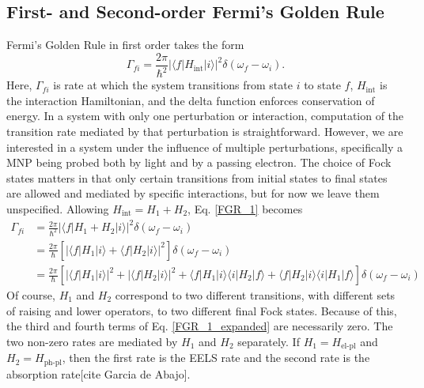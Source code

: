 \documentclass [11pt, proquest] {uwthesis}[2016/11/22]
\begin{document}
\subsection{First- and Second-order Fermi's Golden Rule}

Fermi's Golden Rule in first order takes the form
\begin{equation}
\Gamma_{fi} = \frac{2\pi}{\hbar^2}|\langle f |H_{\textrm{int}}| i \rangle |^2 \delta(\omega_f - \omega_i).
\label{FGR_1}
\end{equation}
Here, $\Gamma_{fi}$ is rate at which the system transitions from state $i$ to state $f$, $H_{\textrm{int}}$ is the interaction Hamiltonian, and the delta function enforces conservation of energy. In a system with only one perturbation or interaction, computation of the transition rate mediated by that perturbation is straightforward. However, we are interested in a system under the influence of multiple perturbations, specifically a MNP being probed both by light and by a passing electron. The choice of Fock states matters in that only certain transitions from initial states to final states are allowed and mediated by specific interactions, but for now we leave them unspecified. Allowing $H_{\textrm{int}} = H_1 + H_2$, Eq. \ref{FGR_1} becomes
\begin{equation}
\begin{aligned}
\Gamma_{fi} &= \frac{2\pi}{\hbar^2}|\langle f |H_1 + H_2| i \rangle |^2 \delta(\omega_f - \omega_i)\\
&= \frac{2\pi}{\hbar}\left[|\langle f |H_1| i \rangle + \langle f |H_2| i \rangle |^2\right] \delta(\omega_f - \omega_i)\\
& = \frac{2\pi}{\hbar}\left[|\langle f|H_1|i \rangle|^2 + |\langle f|H_2|i \rangle|^2 + \langle f|H_1|i \rangle \langle i|H_2|f \rangle + \langle f|H_2|i \rangle \langle i|H_1|f \rangle\right]\delta(\omega_f - \omega_i)
\label{FGR_1_expanded}
\end{aligned}
\end{equation}
Of course, $H_1$ and $H_2$ correspond to two different transitions, with different sets of raising and lower operators, to two different final Fock states. Because of this, the third and fourth terms of Eq. \ref{FGR_1_expanded} are necessarily zero. The two non-zero rates are mediated by $H_1$ and $H_2$ separately. If $H_1 = H_\textrm{el-pl}$ and $H_2 = H_{\textrm{ph-pl}}$, then the first rate is the EELS rate and the second rate is the absorption rate[cite Garcia de Abajo].
\end{document}
